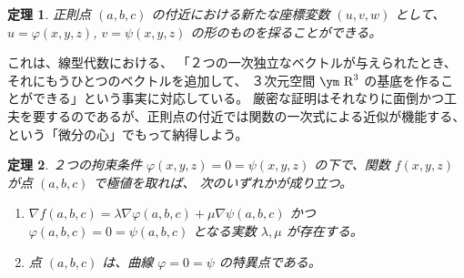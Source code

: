 \documentclass[a4paper]{jsarticle}
\newtheorem{Theorem}{定理}[section]
\theoremstyle{definition}
\theoremstyle{remark}
\newcommand{\R}{\text{\ym R}}
\begin{document}
\begin{Theorem}
正則点 $(a,b,c)$ の付近における新たな座標変数 $(u,v,w)$ として、
$u = \varphi(x,y,z)$, $v = \psi(x,y,z)$ の形のものを採ることができる。
\end{Theorem}

これは、線型代数における、
「２つの一次独立なベクトルが与えられたとき、それにもうひとつのベクトルを追加して、
３次元空間 $\R^3$ の基底を作ることができる」という事実に対応している。
厳密な証明はそれなりに面倒かつ工夫を要するのであるが、正則点の付近では関数の一次式による近似が機能する、
という「微分の心」でもって納得しよう。

\begin{Theorem}
２つの拘束条件 $\varphi(x,y,z) = 0 = \psi(x,y,z)$ の下で、関数 $f(x,y,z)$ が点 $(a,b,c)$ で極値を取れば、
次のいずれかが成り立つ。
\begin{enumerate}
\item 
$\nabla f(a,b,c) = \lambda \nabla \varphi(a,b,c) + \mu \nabla \psi(a,b,c)$ かつ 
$\varphi(a,b,c) = 0 = \psi(a,b,c)$ となる実数 $\lambda, \mu$ が存在する。
\item 
点 $(a,b,c)$ は、曲線 $\varphi = 0 = \psi$ の特異点である。
\end{enumerate}
\end{Theorem} 
\end{document}
